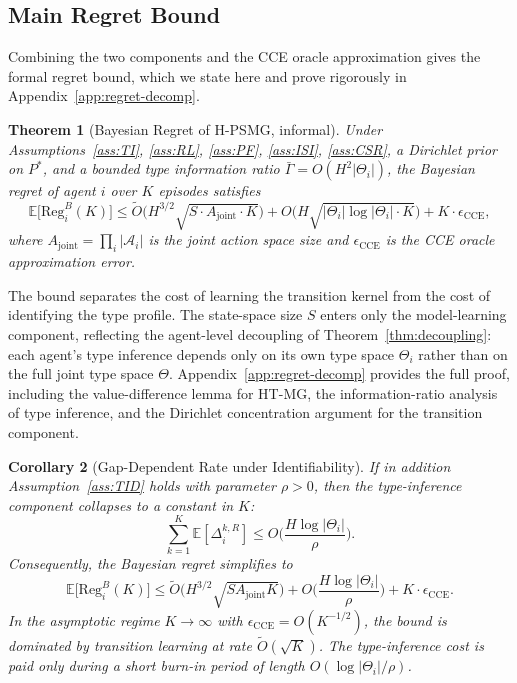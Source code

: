 \documentclass{article}
\newtheorem{theorem}{Theorem}[section]
\newtheorem{corollary}[theorem]{Corollary}
\begin{document}
\subsection{Main Regret Bound}

Combining the two components and the CCE oracle approximation gives the formal regret bound, which we state here and prove rigorously in Appendix~\ref{app:regret-decomp}.

\begin{theorem}[Bayesian Regret of H-PSMG, informal]
\label{thm:main-regret-informal}
Under Assumptions~\ref{ass:TI}, \ref{ass:RL}, \ref{ass:PF}, \ref{ass:ISI}, \ref{ass:CSR}, a Dirichlet prior on $P^*$, and a bounded type information ratio $\bar{\Gamma} = O(H^2 |\Theta_i|)$, the Bayesian regret of agent $i$ over $K$ episodes satisfies
\begin{equation}
\label{eq:main-regret-sketch}
\mathbb{E}\big[\mathrm{Reg}_i^B(K)\big] \leq \tilde{O}\Big(H^{3/2}\sqrt{S \cdot A_{\mathrm{joint}} \cdot K}\Big) + O\Big(H \sqrt{|\Theta_i| \log|\Theta_i| \cdot K}\Big) + K \cdot \epsilon_{\mathrm{CCE}},
\end{equation}
where $A_{\mathrm{joint}} = \prod_i |\mathcal{A}_i|$ is the joint action space size and $\epsilon_{\mathrm{CCE}}$ is the CCE oracle approximation error.
\end{theorem}

The bound separates the cost of learning the transition kernel from the cost of identifying the type profile. The state-space size $S$ enters only the model-learning component, reflecting the agent-level decoupling of Theorem~\ref{thm:decoupling}: each agent's type inference depends only on its own type space $\Theta_i$ rather than on the full joint type space $\Theta$. Appendix~\ref{app:regret-decomp} provides the full proof, including the value-difference lemma for HT-MG, the information-ratio analysis of type inference, and the Dirichlet concentration argument for the transition component.

\begin{corollary}[Gap-Dependent Rate under Identifiability]
\label{cor:gap-dependent}
If in addition Assumption~\ref{ass:TID} holds with parameter $\rho > 0$, then the type-inference component collapses to a constant in $K$:
\begin{equation}
\sum_{k=1}^K \mathbb{E}[\Delta_i^{k,R}] \leq O\bigg(\frac{H \log|\Theta_i|}{\rho}\bigg).
\end{equation}
Consequently, the Bayesian regret simplifies to
\begin{equation}
\mathbb{E}\big[\mathrm{Reg}_i^B(K)\big] \leq \tilde{O}\Big(H^{3/2}\sqrt{S A_{\mathrm{joint}} K}\Big) + O\bigg(\frac{H \log|\Theta_i|}{\rho}\bigg) + K \cdot \epsilon_{\mathrm{CCE}}.
\end{equation}
In the asymptotic regime $K \to \infty$ with $\epsilon_{\mathrm{CCE}} = O(K^{-1/2})$, the bound is dominated by transition learning at rate $\tilde{O}(\sqrt{K})$. The type-inference cost is paid only during a short burn-in period of length $O(\log|\Theta_i| / \rho)$.
\end{corollary}
\end{document}
